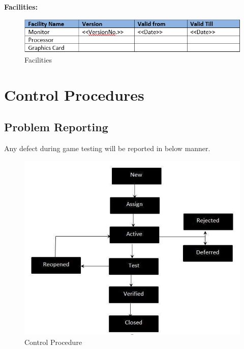 \documentclass{article}
\begin{document}
\textbf{Facilities:}
\begin{figure}[h]
    \centering
    \includegraphics[scale=0.9]{./images/Facilities.PNG}
    \caption{Facilities}
    \label{fig:my_label}
\end{figure}
\newpage

\section{Control Procedures}
\subsection{Problem Reporting}
Any defect during game testing will be reported in below manner.
\begin{figure}[h]
    \centering
    \includegraphics[scale=0.9]{./images/ControlProcedure.PNG}
    \caption{Control Procedure}
    \label{fig:my_label}
\end{figure}
\newpage
\end{document}
